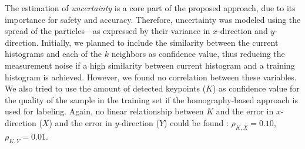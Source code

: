 The estimation of \emph{uncertainty} is a core part of the proposed
approach, due to its importance for safety and accuracy. Therefore,
uncertainty was modeled using the spread of the particles---as
expressed by their variance in $x$-direction and $y$-direction.
Initially, we planned to include the similarity between the current
histograms and each of the $k$ neighbors as confidence value, thus
reducing the measurement noise if a high similarity between current
histogram and a training histogram is achieved. However, we found no
correlation between these variables.
We also tried to use the amount of detected keypoints ($K$) as
confidence value for the quality of the sample in the training set if
the homography-based approach is used for labeling. Again, no linear
relationship between $K$ and the error in $x$-direction ($X$) and the
error in $y$-direction ($Y$) could be found
: $\rho_{K, X} = 0.10$,
$\rho_{K, Y} = 0.01$.

%
%

